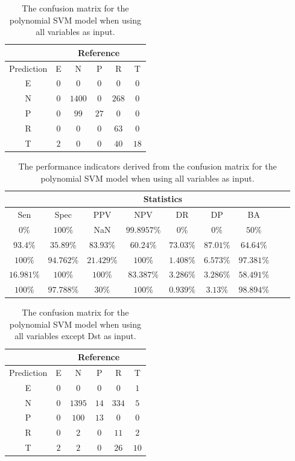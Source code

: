 \begin{table}[!ht]
	\centering
	\begin{tabular}{|c|c|c|c|c|c|}
		\hline
		 & \multicolumn{5}{|c|}{Reference} \\ \hline
		 Prediction & E & N & P & R & T \\ \hline
		 E & $0$ & $0$ & $0$ & $0$ & $0$ \\ \hline
		 N & $0$ & $1400$ & $0$ & $268$ & $0$ \\ \hline
		 P & $0$ & $99$ & $27$ & $0$ & $0$ \\ \hline
		 R & $0$ & $0$ & $0$ & $63$ & $0$ \\ \hline
		 T & $2$ & $0$ & $0$ & $40$ & $18$ \\ \hline
	\end{tabular}
	\caption{The confusion matrix for the polynomial SVM model when using all variables as input.}
	\label{tab:cm:all:svmPoly}
\end{table}

\begin{table}[!ht]
	\centering
	\begin{tabular}{|c|c|c|c|c|c|c|c|c|}
		\hline
		 & \multicolumn{7}{c|}{Statistics} \\ \hline
		Sen & Spec & PPV & NPV & DR & DP & BA \\ \hline
		$0\%$ & $100\%$ & NaN & $99.8957\%$ & $0\%$ & $0\%$ & $50\%$ \\ \hline
		$93.4\%$ & $35.89\%$ & $83.93\%$ & $60.24\%$ & $73.03\%$ & $87.01\%$ & $64.64\%$ \\ \hline
		$100\%$ & $94.762\%$ & $21.429\%$ & $100\%$ & $1.408\%$ & $6.573\%$ & $97.381\%$ \\ \hline
		$16.981\%$ & $100\%$ & $100\%$ & $83.387\%$ & $3.286\%$ & $3.286\%$ & $58.491\%$ \\ \hline
		$100\%$ & $97.788\%$ & $30\%$ & $100\%$ & $0.939\%$ & $3.13\%$ & $98.894\%$ \\ \hline
	\end{tabular}
	\caption{The performance indicators derived from the confusion matrix for the polynomial SVM model when using all variables as input.}
	\label{tab:cs:all:svmPoly}
\end{table}

\begin{table}[!ht]
	\centering
	\begin{tabular}{|c|c|c|c|c|c|}
		\hline
		 & \multicolumn{5}{|c|}{Reference} \\ \hline
		 Prediction & E & N & P & R & T \\ \hline
		 E & $0$ & $0$ & $0$ & $0$ & $1$ \\ \hline
		 N & $0$ & $1395$ & $14$ & $334$ & $5$ \\ \hline
		 P & $0$ & $100$ & $13$ & $0$ & $0$ \\ \hline
		 R & $0$ & $2$ & $0$ & $11$ & $2$ \\ \hline
		 T & $2$ & $2$ & $0$ & $26$ & $10$ \\ \hline
	\end{tabular}
	\caption{The confusion matrix for the polynomial SVM model when using all variables except Dst as input.}
	\label{tab:cm:noDst:svmPoly}
\end{table}


